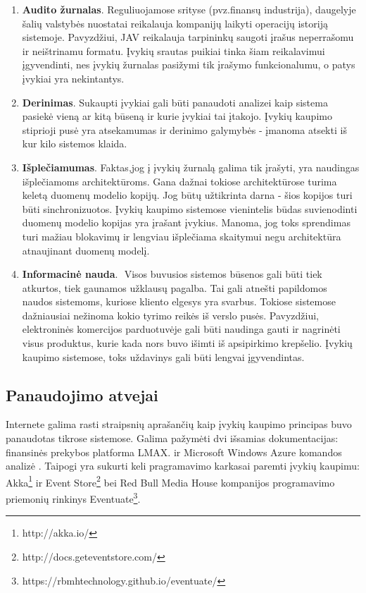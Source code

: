 \begin{enumerate}

  \item \textbf{Audito žurnalas}. Reguliuojamose srityse (pvz.finansų industrija), daugelyje šalių valstybės nuostatai reikalauja kompanijų laikyti operacijų istoriją sistemoje. Pavyzdžiui, JAV reikalauja tarpininkų saugoti įrašus neperrašomu ir neištrinamu formatu. \cite{US:StorageRules} Įvykių srautas puikiai tinka šiam reikalavimui įgyvendinti, nes įvykių žurnalas pasižymi tik įrašymo funkcionalumu, o patys įvykiai yra nekintantys.

  \item \textbf{Derinimas}. Sukaupti įvykiai gali būti panaudoti analizei kaip sistema pasiekė vieną ar kitą būseną ir kurie įvykiai tai įtakojo. Įvykių kaupimo stiprioji pusė yra atsekamumas ir derinimo galymybės - įmanoma atsekti iš kur kilo sistemos klaida.

  \item \textbf{Išplečiamumas}. Faktas,jog į įvykių žurnalą galima tik įrašyti, yra naudingas išplečiamoms architektūroms. Gana dažnai tokiose architektūrose turima keletą duomenų modelio kopijų. Jog būtų užtikrinta darna - šios kopijos turi būti sinchronizuotos. Įvykių kaupimo sistemose vienintelis būdas suvienodinti duomenų modelio kopijas yra įrašant įvykius. Manoma, jog toks sprendimas turi mažiau blokavimų ir lengviau išplečiama skaitymui negu architektūra atnaujinant duomenų modelį. \cite{GetEventStore:Basics}

  \item \textbf{Informacinė nauda}.  Visos buvusios sistemos būsenos gali būti tiek atkurtos, tiek gaunamos užklausų pagalba. Tai gali atnešti papildomos naudos sistemoms, kuriose kliento elgesys yra svarbus. Tokiose sistemose dažniausiai nežinoma kokio tyrimo reikės iš verslo pusės. Pavyzdžiui, elektroninės komercijos parduotuvėje gali būti naudinga gauti ir nagrinėti visus produktus, kurie kada nors buvo išimti iš apsipirkimo krepšelio. Įvykių kaupimo sistemose, toks uždavinys gali būti lengvai įgyvendintas.

\end{enumerate}

\subsection{Panaudojimo atvejai}

Internete galima rasti straipsnių aprašančių kaip įvykių kaupimo principas buvo panaudotas tikrose sistemose. Galima pažymėti dvi išsamias dokumentacijas: finansinės prekybos platforma LMAX. \cite{Fowler:LMAX} ir Microsoft Windows Azure komandos analizė \cite{Betts:2013:ECE:2509680}. Taipogi yra sukurti keli pragramavimo karkasai paremti įvykių kaupimu: Akka\footnote{http://akka.io/} ir Event Store\footnote{http://docs.geteventstore.com/} bei Red Bull Media House kompanijos programavimo priemonių rinkinys Eventuate\footnote{https://rbmhtechnology.github.io/eventuate/}.


